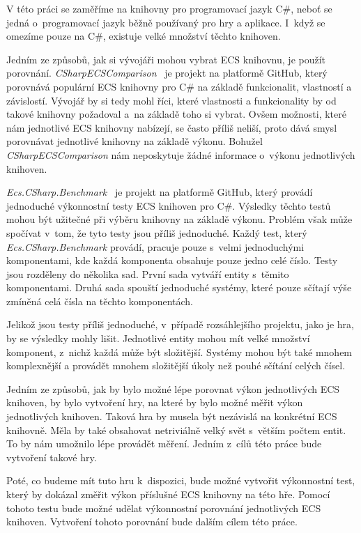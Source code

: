 V této práci se zaměříme na knihovny pro programovací jazyk C\#, neboť se jedná o~programovací jazyk běžně používaný pro hry a aplikace. I~když se omezíme pouze na C\#, existuje velké množství těchto knihoven.

Jedním ze způsobů, jak si vývojáři mohou vybrat ECS knihovnu, je použít porovnání. \textit{CSharpECSComparison}~\cite{CSharpECSComparison} je projekt na platformě GitHub, který porovnává populární ECS knihovny pro C\# na základě funkcionalit, vlastností a závislostí. Vývojář by si tedy mohl říci, které vlastnosti a funkcionality by od takové knihovny požadoval a~na základě toho si vybrat. Ovšem možnosti, které nám jednotlivé ECS knihovny nabízejí, se často příliš neliší, proto dává smysl porovnávat jednotlivé knihovny na základě výkonu. Bohužel \textit{CSharpECSComparison} nám neposkytuje žádné informace o~výkonu jednotlivých knihoven.

\textit{Ecs.CSharp.Benchmark}~\cite{EcsCsharpBenchmark} je projekt na platformě GitHub, který provádí jednoduché výkonnostní testy ECS knihoven pro C\#. Výsledky těchto testů mohou být užitečné při výběru knihovny na základě výkonu. Problém však může spočívat v~tom, že tyto testy jsou příliš jednoduché. Každý test, který \textit{Ecs.CSharp.Benchmark} provádí, pracuje pouze s~velmi jednoduchými komponentami, kde každá komponenta obsahuje pouze jedno celé číslo. Testy jsou rozděleny do několika sad. První sada vytváří entity s~těmito komponentami. Druhá sada spouští jednoduché systémy, které pouze sčítají výše zmíněná celá čísla na těchto komponentách.

Jelikož jsou testy příliš jednoduché, v~případě rozsáhlejšího projektu, jako je hra, by se výsledky mohly lišit. Jednotlivé entity mohou mít velké množství komponent, z~nichž každá může být složitější. Systémy mohou být také mnohem komplexnější a provádět mnohem složitější úkoly než pouhé sčítání celých čísel.

Jedním ze způsobů, jak by bylo možné lépe porovnat výkon jednotlivých ECS knihoven, by bylo vytvoření hry, na které by bylo možné měřit výkon jednotlivých knihoven. Taková hra by musela být nezávislá na konkrétní ECS knihovně. Měla by také obsahovat netriviálně velký svět s~větším počtem entit. To by nám umožnilo lépe provádět měření. Jedním z~cílů této práce bude vytvoření takové hry.

Poté, co budeme mít tuto hru k~dispozici, bude možné vytvořit výkonnostní test, který by dokázal změřit výkon příslušné ECS knihovny na této hře. Pomocí tohoto testu bude možné udělat výkonnostní porovnání jednotlivých ECS knihoven. Vytvoření tohoto porovnání bude dalším cílem této práce.

